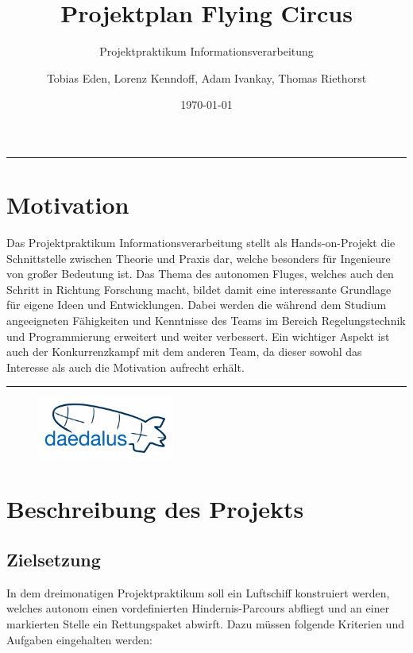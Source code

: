 \documentclass[lang=ngerman,inputenc=utf8,fontsize=10pt]{ldvarticle}
\title{Projektplan Flying Circus}
\subtitle{Projektpraktikum Informationsverarbeitung}
\author{Tobias Eden, Lorenz Kenndoff, Adam Ivankay, Thomas Riethorst}
\date{\today}
\begin{document}
	\maketitle	
	\thispagestyle{empty}

\hrule

\section*{Motivation}

Das Projektpraktikum Informationsverarbeitung stellt als Hands-on-Projekt die Schnittstelle zwischen Theorie und Praxis dar, welche besonders für Ingenieure von großer Bedeutung ist.
Das Thema des autonomen Fluges, welches auch den Schritt in Richtung Forschung macht, bildet damit eine interessante Grundlage für eigene Ideen und Entwicklungen. 
Dabei werden die während dem Studium angeeigneten Fähigkeiten und Kenntnisse des Teams im Bereich Regelungstechnik und Programmierung erweitert und weiter verbessert. 
Ein wichtiger Aspekt ist auch der  Konkurrenzkampf mit dem anderen Team, da dieser sowohl das Interesse als auch die Motivation aufrecht erhält.   




\vspace*{1cm}
\hrule


\begin{figure}[!b]
\centering
\includegraphics[width=0.4\textwidth]{logo_kl.png}
\end{figure}

\newpage


\section{Beschreibung des Projekts}

\subsection*{Zielsetzung}
In dem dreimonatigen Projektpraktikum soll ein Luftschiff konstruiert werden, welches autonom einen vordefinierten Hindernis-Parcours abfliegt und an einer markierten Stelle ein Rettungspaket abwirft. Dazu müssen folgende Kriterien und Aufgaben eingehalten werden:
\end{document}
